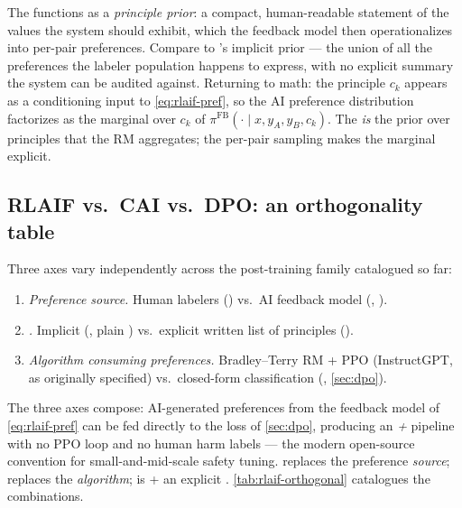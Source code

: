 \begin{intuition}
The  functions as a \emph{principle prior}: a compact,
human-readable statement of the values the system should exhibit,
which the feedback model then operationalizes into per-pair
preferences. Compare to 's implicit prior — the union of all the
preferences the labeler population happens to express, with no
explicit summary the system can be audited against. Returning to math:
the principle $c_k$ appears as a conditioning input to
\cref{eq:rlaif-pref}, so the AI preference distribution factorizes as
the marginal over $c_k$ of $\pi^{\mathrm{FB}}(\cdot \mid x, y_A, y_B,
c_k)$. The  \emph{is} the prior over principles that the
RM aggregates; the per-pair sampling makes the marginal explicit.
\end{intuition}

\subsection{RLAIF vs.\ CAI vs.\ DPO: an orthogonality table}
\label{sec:rlaif-orthogonal}

Three axes vary independently across the post-training family
catalogued so far:
\begin{enumerate}
\item \emph{Preference source.} Human labelers () vs.\ AI feedback
model (, ).
\item \emph{.} Implicit (, plain ) vs.\ explicit
written list of principles ().
\item \emph{Algorithm consuming preferences.} Bradley--Terry RM + PPO
(InstructGPT,  as originally specified) vs.\ closed-form
classification (, \cref{sec:dpo}).
\end{enumerate}
The three axes compose: AI-generated preferences from the feedback
model of \cref{eq:rlaif-pref} can be fed directly to the  loss of
\cref{sec:dpo}, producing an \emph{ + } pipeline with no PPO
loop and no human harm labels — the modern open-source convention for
small-and-mid-scale safety tuning.  replaces the preference
\emph{source};  replaces the \emph{algorithm};  is  + an
explicit . \cref{tab:rlaif-orthogonal} catalogues the
combinations.

